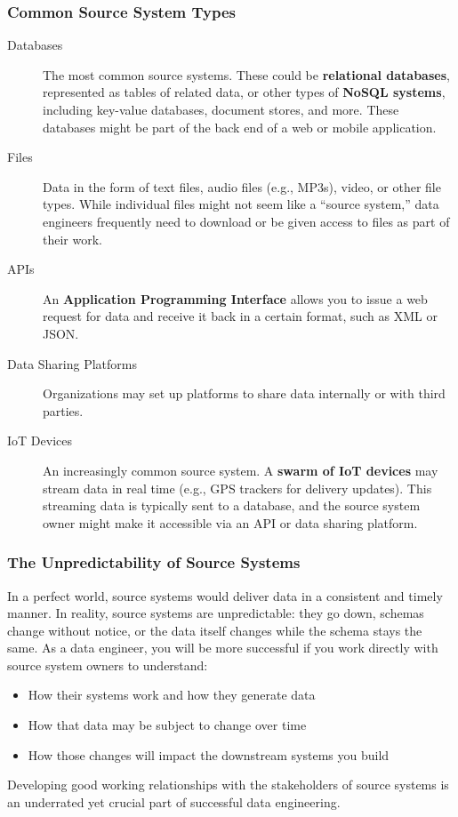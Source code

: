 \documentclass{article}
\begin{document}
\subsubsection{Common Source System Types}
\begin{description}
    \item[Databases] The most common source systems. These could be \textbf{relational databases}, represented as tables of related data, or other types of \textbf{NoSQL systems}, including key-value databases, document stores, and more. These databases might be part of the back end of a web or mobile application.

    \item[Files] Data in the form of text files, audio files (e.g., MP3s), video, or other file types. While individual files might not seem like a ``source system,'' data engineers frequently need to download or be given access to files as part of their work.

    \item[APIs] An \textbf{Application Programming Interface} allows you to issue a web request for data and receive it back in a certain format, such as XML or JSON.

    \item[Data Sharing Platforms] Organizations may set up platforms to share data internally or with third parties.

    \item[IoT Devices] An increasingly common source system. A \textbf{swarm of IoT devices} may stream data in real time (e.g., GPS trackers for delivery updates). This streaming data is typically sent to a database, and the source system owner might make it accessible via an API or data sharing platform.
\end{description}

\subsubsection{The Unpredictability of Source Systems}
In a perfect world, source systems would deliver data in a consistent and timely manner. In reality, source systems are unpredictable: they go down, schemas change without notice, or the data itself changes while the schema stays the same. As a data engineer, you will be more successful if you work directly with source system owners to understand:
\begin{itemize}
    \item How their systems work and how they generate data
    \item How that data may be subject to change over time
    \item How those changes will impact the downstream systems you build
\end{itemize}
Developing good working relationships with the stakeholders of source systems is an underrated yet crucial part of successful data engineering.
\end{document}
